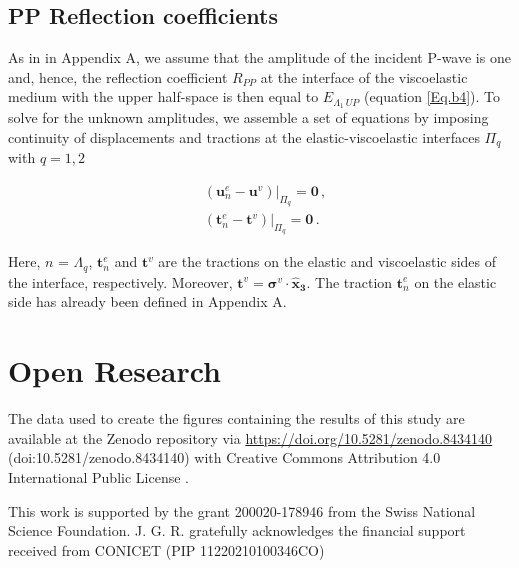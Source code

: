 \documentclass[draft]{agujournal2019}
\begin{document}
\subsection{PP Reflection coefficients}
As in in Appendix A, we assume that the amplitude of the incident P-wave is one and, hence, the reflection coefficient $R_{PP}$ at the interface of the viscoelastic medium with the upper half-space is then equal to $E_{\Lambda_1\, UP}$ (equation \eqref{Eq.b4}). To solve for the unknown amplitudes, we assemble a set of equations by imposing continuity of displacements and tractions at the elastic-viscoelastic interfaces $\Pi_q$ with $q=1,2$
\begin{linenomath*}
\begin{equation}\label{Eq.b10}
\begin{split}
&  \left. \left(  \bm{u}_n^e -  \bm{u}^v \right) \right \rvert_{\Pi_q} = \bm{0} \,, \\
&  \left. \left( \bm{t}_n^e  - \bm{t}^v  \right) \right \rvert_{\Pi_q} = \bm{0} \,.
\end{split}
\end{equation}
\end{linenomath*}
Here, $n$ = $\Lambda_q$, $\bm{t}_n^e$ and $\bm{t}^v$ are the tractions on the elastic and viscoelastic sides of the interface, respectively. Moreover, $\bm{t}^v =\bm{\sigma}^v \cdot \bm{\hat {x}_3} $. The traction $\bm{t}_n^e$ on the elastic side has already been defined in Appendix A.

\section*{Open Research}
The data used to create the figures containing the results of this study are available at the Zenodo repository via \url{https://doi.org/10.5281/zenodo.8434140} (doi:10.5281/zenodo.8434140) with Creative Commons Attribution 4.0 International Public License \cite{Sotelo2023}.

%

\acknowledgments
This work is supported by the grant 200020-178946 from the Swiss National Science Foundation. J. G. R. gratefully acknowledges the financial support received from CONICET (PIP 11220210100346CO)

\end{document}

